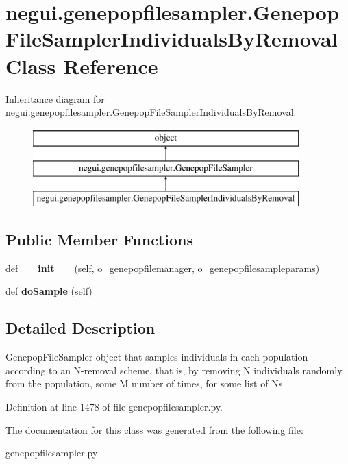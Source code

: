 \hypertarget{classnegui_1_1genepopfilesampler_1_1GenepopFileSamplerIndividualsByRemoval}{}\section{negui.\+genepopfilesampler.\+Genepop\+File\+Sampler\+Individuals\+By\+Removal Class Reference}
\label{classnegui_1_1genepopfilesampler_1_1GenepopFileSamplerIndividualsByRemoval}
Inheritance diagram for negui.\+genepopfilesampler.\+Genepop\+File\+Sampler\+Individuals\+By\+Removal\+:\begin{figure}[H]
\begin{center}
\leavevmode
\includegraphics[height=3.000000cm]{classnegui_1_1genepopfilesampler_1_1GenepopFileSamplerIndividualsByRemoval}
\end{center}
\end{figure}
\subsection*{Public Member Functions}
\begin{DoxyCompactItemize}
\item 
def {\bfseries \+\_\+\+\_\+init\+\_\+\+\_\+} (self, o\+\_\+genepopfilemanager, o\+\_\+genepopfilesampleparams)\hypertarget{classnegui_1_1genepopfilesampler_1_1GenepopFileSamplerIndividualsByRemoval_aeba1258d811dd266cb3378212a4a1926}{}\label{classnegui_1_1genepopfilesampler_1_1GenepopFileSamplerIndividualsByRemoval_aeba1258d811dd266cb3378212a4a1926}

\item 
def {\bfseries do\+Sample} (self)\hypertarget{classnegui_1_1genepopfilesampler_1_1GenepopFileSamplerIndividualsByRemoval_a89dd3d276b9f089ac4c46dd844e7a848}{}\label{classnegui_1_1genepopfilesampler_1_1GenepopFileSamplerIndividualsByRemoval_a89dd3d276b9f089ac4c46dd844e7a848}

\end{DoxyCompactItemize}


\subsection{Detailed Description}
\begin{DoxyVerb}GenepopFileSampler object that samples individuals in each population
according to an N-removal scheme, that is, by removing N individuals 
randomly from the population, some M number of times, for some list of Ns
\end{DoxyVerb}
 

Definition at line 1478 of file genepopfilesampler.\+py.



The documentation for this class was generated from the following file\+:\begin{DoxyCompactItemize}
\item 
genepopfilesampler.\+py\end{DoxyCompactItemize}

